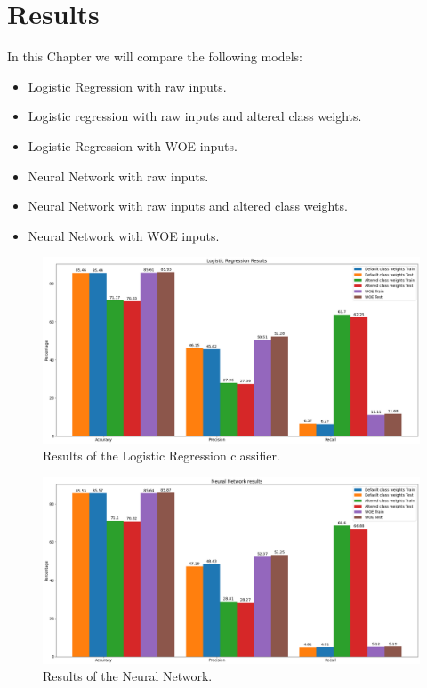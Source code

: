 \section{Results}
In this Chapter we will compare the following models:
\begin{itemize}
    \item Logistic Regression with raw inputs.
    \item Logistic regression with raw inputs and altered class weights.
    \item Logistic Regression with WOE inputs.
    \item Neural Network with raw inputs.
    \item Neural Network with raw inputs and altered class weights.
    \item Neural Network with WOE inputs.
\end{itemize}

\begin {figure}[!htpb]
\centering
  \includegraphics[width=\linewidth]{Credit_Images/Results_Logistic.png}
   \caption{Results of the Logistic Regression classifier.}
    \label{fig-log-results}
\end{figure}
\begin {figure}[!htpb]
\centering
  \includegraphics[width=\linewidth]{Credit_Images/NN_res.png}
   \caption{Results of the Neural Network.}
    \label{fig-nn-results}
\end{figure}

